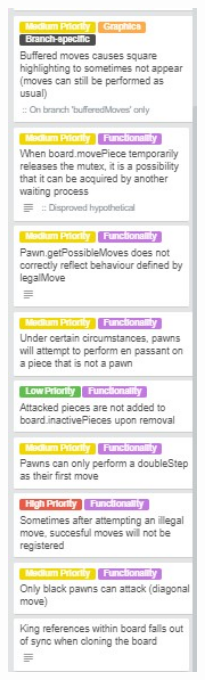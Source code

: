 \documentclass{article}
\begin{document}
\includegraphics[width=5cm]{bugsFixed2.jpg}
\end{document}
